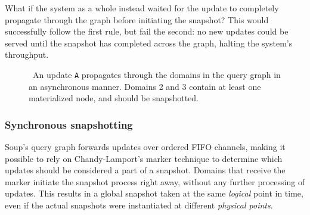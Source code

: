What if the system as a whole instead waited for the update to completely
propagate through the graph before initiating the snapshot? This would
successfully follow the first rule, but fail the second: no new updates could be
served until the snapshot has completed across the graph, halting
the system's throughput.

\begin{figure}[H]
  \centering
  
  \caption{\
    An update \texttt{A} propagates through the domains in the query graph in an
    asynchronous manner. Domains 2 and 3 contain at least one materialized node,
    and should be snapshotted.
  }\label{fig:bad-example}
\end{figure}

\subsubsection{Synchronous snapshotting}

Soup's query graph forwards updates over ordered FIFO channels, making it
possible to rely on Chandy-Lamport's marker technique to determine which updates
should be considered a part of a snapshot. Domains that receive the
marker initiate the snapshot process right away, without any further processing
of updates. This results in a global snapshot taken at the same \textit{logical}
point in time, even if the actual snapshots were instantiated at different
\textit{physical points}.

